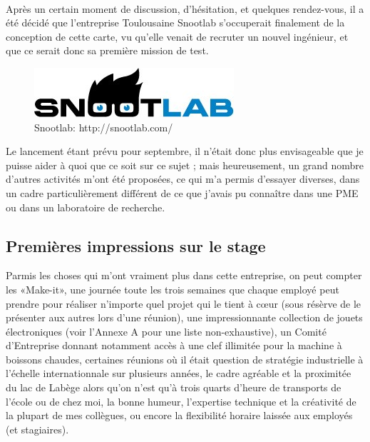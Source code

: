 \documentclass{article}
\begin{document}
~

Après un certain moment de discussion, d’hésitation, et quelques rendez-vous, il a été décidé que l’entreprise Toulousaine Snootlab s’occuperait finalement de la conception de cette carte, vu qu’elle venait de recruter un nouvel ingénieur, et que ce serait donc sa première mission de test.

\begin{figure}[h!]
    \centering\includegraphics[width=\linewidth/2]{img/snoot.jpg}
    \caption{Snootlab: http://snootlab.com/}
\end{figure}

Le lancement étant prévu pour septembre, il n’était donc plus envisageable que je puisse aider à quoi que ce soit sur ce sujet ; mais heureusement, un grand nombre d’autres activités m’ont été proposées, ce qui m’a permis d’essayer diverses, dans un cadre particulièrement différent de ce que j’avais pu connaître dans une PME ou dans un laboratoire de recherche.

\subsection{Premières impressions sur le stage}

Parmis les choses qui m’ont vraiment plus dans cette entreprise, on peut compter
les «Make-it», une journée toute les trois semaines que chaque employé peut prendre pour réaliser n’importe quel projet qui le tient à cœur (sous résèrve de le présenter aux autres lors d’une réunion),
une impressionnante collection de jouets électroniques (voir l’Annexe A pour une liste non-exhaustive),
un Comité d’Entreprise donnant notamment accès à une clef illimitée pour la machine à boissons chaudes,
certaines réunions où il était question de stratégie industrielle à l’échelle internationnale sur plusieurs années,
le cadre agréable et la proximitée du lac de Labège alors qu’on n’est qu’à trois quarts d’heure de transports de l’école ou de chez moi,
la bonne humeur, l’expertise technique et la créativité de la plupart de mes collègues,
ou encore la flexibilité horaire laissée aux employés (et stagiaires).

~
\end{document}
